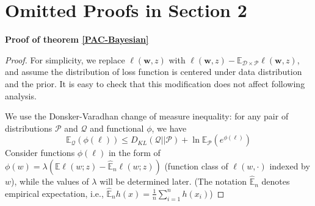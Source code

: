 \documentclass[final,12pt]{colt2018} %
\newcommand{\w}{\bm{w}}
\begin{document}
\section{Omitted Proofs in Section 2}

\textbf{Proof of theorem \ref{PAC-Bayesian}}
\begin{proof}
	For simplicity, we replace $\ell(\w,z)$ with $\ell(\w,z)-\mathbb{E}_{\mathcal{D}\times \mathcal{P}}\ell(\w,z)$, and assume the distribution of loss function is centered under data distribution and the prior. It is easy to check that this modification does not affect following analysis.

	We use the Donsker-Varadhan change of measure inequality: for any pair of distributions $\mathcal{P}$ and $\mathcal{Q}$ and functional $\phi$, we have
\begin{equation}\label{donsker-varadhan}
	\mathbb{E}_{\mathcal{Q}} (\phi(\ell))\leq D_{KL}(\mathcal{Q}||\mathcal{P})+\ln\mathbb{E}_{\mathcal{P}} \left(e^{\phi(\ell)}\right)
\end{equation}
Consider functions $\phi(\ell)$ in the form of $\phi(w)=\lambda\left(\mathbb{E}\ell(w;z)-\hat{\mathbb{E}}_n \ell(w;z)\right)$ (function class of $\ell(w,\cdot)$ indexed by $w$), while the values of $\lambda$ will be determined later. (The notation $\hat{\mathbb{E}}_n$ denotes empirical expectation, i.e., $\hat{\mathbb{E}}_n h(x)=\frac{1}{n}\sum_{i=1}^n h(x_i)$)


\end{proof}
\end{document}

